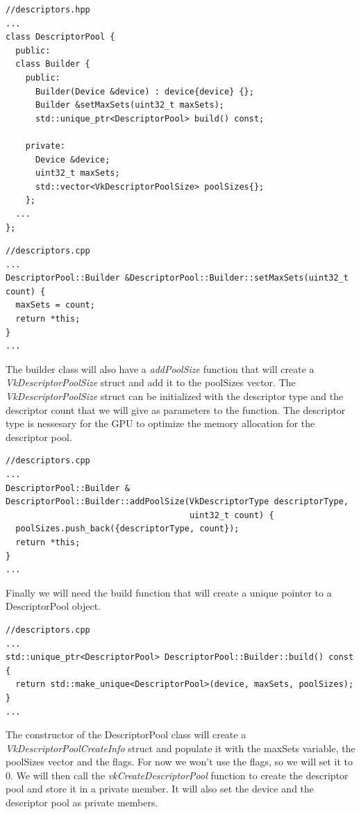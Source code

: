 \documentclass[12pt]{report} \usepackage{preamble}
\begin{document}
\begin{lstlisting}[Language=C++]
//descriptors.hpp
...
class DescriptorPool {
  public:
  class Builder {
    public:
      Builder(Device &device) : device{device} {};
      Builder &setMaxSets(uint32_t maxSets);
      std::unique_ptr<DescriptorPool> build() const;

    private:
      Device &device;
      uint32_t maxSets;
      std::vector<VkDescriptorPoolSize> poolSizes{};
    };
  ...
};
\end{lstlisting}

\begin{lstlisting}[Language=C++]
//descriptors.cpp
...
DescriptorPool::Builder &DescriptorPool::Builder::setMaxSets(uint32_t count) {
  maxSets = count;
  return *this;
}
...
\end{lstlisting}

The builder class will also have a \textit{addPoolSize} function that will create a \textit{VkDescriptorPoolSize} struct and add it to the poolSizes vector.
The \textit{VkDescriptorPoolSize} struct can be initialized with the descriptor type and the descriptor count that we will give as parameters to the function.
The descriptor type is nessesary for the GPU to optimize the memory allocation for the descriptor pool.

\begin{lstlisting}[Language=C++]
//descriptors.cpp
...
DescriptorPool::Builder &
DescriptorPool::Builder::addPoolSize(VkDescriptorType descriptorType,
                                     uint32_t count) {
  poolSizes.push_back({descriptorType, count});
  return *this;
}
...
\end{lstlisting}

Finally we will need the build function that will create a unique pointer to a DescriptorPool object.

\begin{lstlisting}[Language=C++]
//descriptors.cpp
...
std::unique_ptr<DescriptorPool> DescriptorPool::Builder::build() const {
  return std::make_unique<DescriptorPool>(device, maxSets, poolSizes);
}
...
\end{lstlisting}

The constructor of the DescriptorPool class will create a \textit{VkDescriptorPoolCreateInfo} struct and populate it with the maxSets variable, the poolSizes vector and the flags.
For now we won't use the flags, so we will set it to 0. We will then call the \textit{vkCreateDescriptorPool} function to create the descriptor pool and store it in a private member.
It will also set the device and the descriptor pool as private members.
\end{document}

